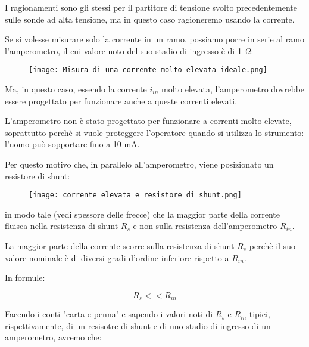 I ragionamenti sono gli stessi per il partitore di tensione svolto precedentemente sulle sonde ad alta tensione, 
ma in questo caso ragioneremo usando la corrente. \newline 

Se si volesse misurare solo la corrente in un ramo, possiamo porre in serie al ramo l'amperometro, 
il cui valore noto del suo stadio di ingresso è di 1 $\Omega$: 

\begin{figure}[h]
    \centering
    \texttt{[image: Misura di una corrente molto elevata ideale.png]}
\end{figure}

Ma, in questo caso, essendo la corrente $i_{in}$ molto elevata, l'amperometro dovrebbe essere progettato per funzionare anche a queste correnti elevati. \newline 

L'amperometro non è stato progettato per funzionare a correnti molto elevate, soprattutto perchè si vuole proteggere l'operatore quando si utilizza lo strumento:
l'uomo può sopportare fino a 10 mA. \newline 

Per questo motivo che, in parallelo all'amperometro, viene posizionato un resistore di shunt: 

\begin{figure}[h]
    \centering
    \texttt{[image: corrente elevata e resistore di shunt.png]}
\end{figure}

in modo tale (vedi spessore delle frecce) che la maggior parte della corrente fluisca nella resistenza di shunt $R_s$ e non sulla resistenza dell'amperometro $R_{in}$. \newline 

La maggior parte della corrente scorre sulla resistenza di shunt $R_s$ perchè il suo valore nominale è di diversi gradi d'ordine inferiore rispetto a $R_{in}$. \newline 

In formule: 

{
    \Large 
    \begin{equation}
        R_s << R_{in}
    \end{equation}
}


Facendo i conti "carta e penna" e sapendo i valori noti di $R_s$ e $R_{in}$ tipici, rispettivamente, di un resisotre di shunt e di uno stadio di ingresso di un amperometro, 
avremo che: 

